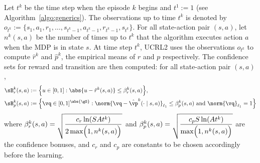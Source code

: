 Let $t^k$ be the time step when the episode $k$ begins and $t^1:=1$ (see Algorithm~\ref{algo:generics}).
The observations up to time $t^k$ is denoted by $o_{t^k}{:=}\{s_1,a_1,r_1,\dots,s_{t^k-1},a_{t^k-1},r_{t^k-1},s_{t^k}\}$.
For all state-action pair $(s,a)$, let $n^k(s,a)$ be the number of times up to $t^k$ that the algorithm executes action $a$ when the MDP is in state $s$.
At time step $t^k$, UCRL2 uses the observations $o_{t^k}$ to compute $\hat{r}^k$ and $\hat{p}^k$, the empirical means of $r$ and $p$ respectively.
The confidence sets for reward and transition are then computed: for all state-action pair $(s,a)$,
\begin{align*}
    \sB_r^k(s,a)&:=\Bigl\{u\in[0,1] : \abs{u-\hat{r}^k(s,a)}\le\beta^k_r(s,a)\Bigr\}, \\
    \sB_p^k(s,a)&:=\Bigl\{\vq\in[0,1]^{\abs{\gS}}: \norm{\vq-\hat{\vp}^k(\cdot\mid s,a)}_{\ell_1}\le \beta^k_p(s,a)
    \text{ and }\norm{\vq}_{\ell_1}=1\Bigr\}
\end{align*}
where $\beta_r^k(s,a)=\displaystyle\sqrt{\frac{c_r\ln(SAt^k)}{2\max\Bigl(1,n^k(s,a)\Bigr)}}$ and $\beta_p^k(s,a)=\displaystyle\sqrt{\frac{c_pS\ln(At^k)}{\max\Bigl(1,n^k(s,a)\Bigr)}}$ are the confidence bonuses, and $c_r$ and $c_p$ are constants to be chosen accordingly before the learning.

